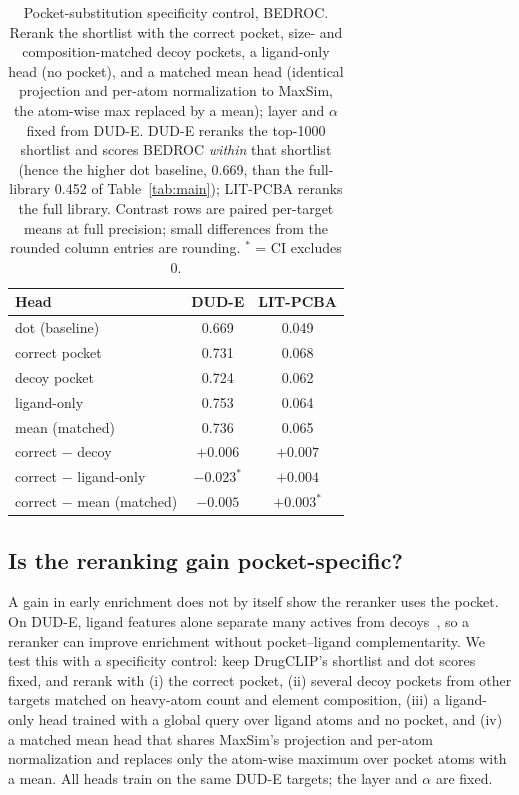 \documentclass[10pt,letterpaper,twocolumn]{article}
\begin{document}
\begin{table}[t]
\centering
\footnotesize
\setlength{\tabcolsep}{4pt}
\caption{Pocket-substitution specificity control, BEDROC. Rerank the shortlist with the correct pocket, size- and composition-matched decoy pockets, a ligand-only head (no pocket), and a matched mean head (identical projection and per-atom normalization to MaxSim, the atom-wise max replaced by a mean); layer and $\alpha$ fixed from DUD-E. DUD-E reranks the top-1000 shortlist and scores BEDROC \emph{within} that shortlist (hence the higher dot baseline, 0.669, than the full-library 0.452 of Table~\ref{tab:main}); LIT-PCBA reranks the full library. Contrast rows are paired per-target means at full precision; small differences from the rounded column entries are rounding. $^{*}$ = CI excludes 0.}
\label{tab:specificity}
\begin{tabular}{@{}lcc@{}}
\toprule
Head & DUD-E & LIT-PCBA \\
\midrule
dot (baseline) & 0.669 & 0.049 \\
correct pocket & 0.731 & 0.068 \\
decoy pocket & 0.724 & 0.062 \\
ligand-only & 0.753 & 0.064 \\
mean (matched) & 0.736 & 0.065 \\
\midrule
correct $-$ decoy & $+0.006$ & $+0.007$ \\
correct $-$ ligand-only & $-0.023^{*}$ & $+0.004$ \\
correct $-$ mean (matched) & $-0.005$ & $+0.003^{*}$ \\
\bottomrule
\end{tabular}
\end{table}

\subsection{Is the reranking gain pocket-specific?}
\label{sec:specificity}

A gain in early enrichment does not by itself show the reranker uses the pocket. On DUD-E, ligand features alone separate many actives from decoys~\cite{chen}, so a reranker can improve enrichment without pocket--ligand complementarity. We test this with a specificity control: keep DrugCLIP's shortlist and dot scores fixed, and rerank with (i) the correct pocket, (ii) several decoy pockets from other targets matched on heavy-atom count and element composition, (iii) a ligand-only head trained with a global query over ligand atoms and no pocket, and (iv) a matched mean head that shares MaxSim's projection and per-atom normalization and replaces only the atom-wise maximum over pocket atoms with a mean. All heads train on the same DUD-E targets; the layer and $\alpha$ are fixed.
\end{document}

